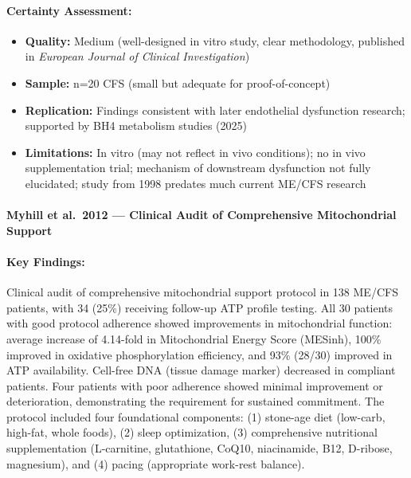 \paragraph{Certainty Assessment:}
\begin{itemize}
    \item \textbf{Quality:} Medium (well-designed in vitro study, clear methodology, published in \emph{European Journal of Clinical Investigation})
    \item \textbf{Sample:} n=20 CFS (small but adequate for proof-of-concept)
    \item \textbf{Replication:} Findings consistent with later endothelial dysfunction research; supported by BH4 metabolism studies (2025)
    \item \textbf{Limitations:} In vitro (may not reflect in vivo conditions); no in vivo supplementation trial; mechanism of downstream dysfunction not fully elucidated; study from 1998 predates much current ME/CFS research
\end{itemize}

\paragraph{Myhill et al.\ 2012 --- Clinical Audit of Comprehensive Mitochondrial Support}

\cite{Myhill2012audit}

\paragraph{Key Findings:}
Clinical audit of comprehensive mitochondrial support protocol in 138 ME/CFS patients, with 34 (25\%) receiving follow-up ATP profile testing. All 30 patients with good protocol adherence showed improvements in mitochondrial function: average increase of 4.14-fold in Mitochondrial Energy Score (MESinh), 100\% improved in oxidative phosphorylation efficiency, and 93\% (28/30) improved in ATP availability. Cell-free DNA (tissue damage marker) decreased in compliant patients. Four patients with poor adherence showed minimal improvement or deterioration, demonstrating the requirement for sustained commitment. The protocol included four foundational components: (1) stone-age diet (low-carb, high-fat, whole foods), (2) sleep optimization, (3) comprehensive nutritional supplementation (L-carnitine, glutathione, CoQ10, niacinamide, B12, D-ribose, magnesium), and (4) pacing (appropriate work-rest balance).

